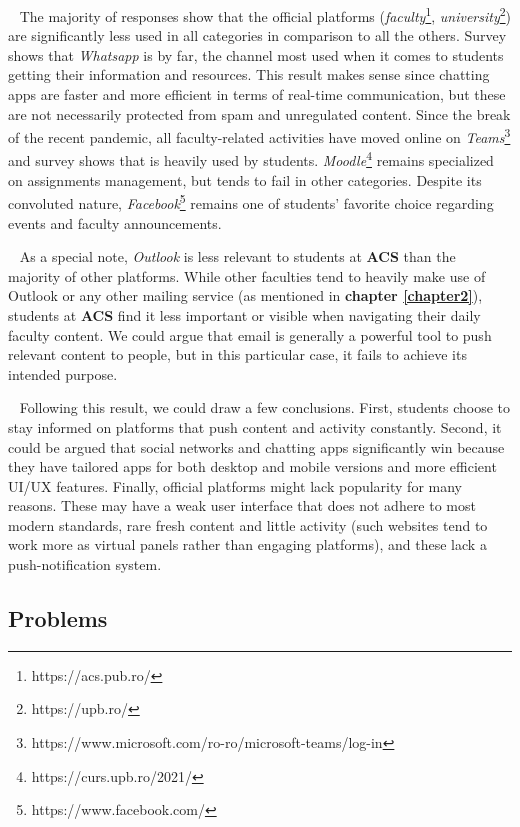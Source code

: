 ~
The majority of responses show that the official platforms (\textit{faculty}\footnote{https://acs.pub.ro/}, \textit{university}\footnote{https://upb.ro/}) are significantly less used in all categories in comparison to all the others. Survey shows that \textit{Whatsapp} is by far, the channel most used when it comes to students getting their information and resources. This result makes sense since chatting apps are faster and more efficient in terms of real-time communication, but these are not necessarily protected from spam and unregulated content. Since the break of the recent pandemic, all faculty-related activities have moved online on \textit{Teams}\footnote{https://www.microsoft.com/ro-ro/microsoft-teams/log-in} and survey shows that is heavily used by students. \textit{Moodle}\footnote{https://curs.upb.ro/2021/} remains specialized on assignments management, but tends to fail in other categories. Despite its convoluted nature, \textit{Facebook}\footnote{https://www.facebook.com/} remains one of students' favorite choice regarding events and faculty announcements.

~ 
As a special note, \textit{Outlook} is less relevant to students at \textbf{ACS} than the majority of other platforms. While other faculties tend to heavily make use of Outlook or any other mailing service (as mentioned in \textbf{chapter \ref{chapter2}}), students at \textbf{ACS} find it less important or visible when navigating their daily faculty content. We could argue that email is generally a powerful tool to push relevant content to people, but in this particular case, it fails to achieve its intended purpose.

~
Following this result, we could draw a few conclusions. First, students choose to stay informed on platforms that push content and activity constantly. Second, it could be argued that social networks and chatting apps significantly win because they have tailored apps for both desktop and mobile versions and more efficient UI/UX features. Finally, official platforms might lack popularity for many reasons. These may have a weak user interface that does not adhere to most modern standards, rare fresh content and little activity (such websites tend to work more as virtual panels rather than engaging platforms), and these lack a push-notification system.

\subsection{Problems} \label{3:problems}

